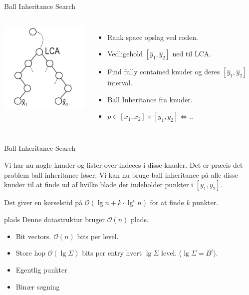 \documentclass[pdf]{beamer}
\begin{document}
\begin{frame}{Ball Inheritance Search}
  \begin{center}
    \begin{columns}
        \includegraphics[scale=1.5]{pictures/BIS.pdf}
        \begin{itemize}
          \item Rank space opslag ved roden.
          \item Vedligehold $[\hat{y}_1, \hat{y}_2]$ ned til LCA.
          \item Find fully contained knuder og deres $[\hat{y}_1, \hat{y}_2]$ interval.
          \item Ball Inheritance fra knuder.
          \item $p \in [x_1, x_2] \times [y_1, y_2] \Leftrightarrow ..$
        \end{itemize}
      \end{columns}
  \end{center}
\end{frame}

\begin{frame}{Ball Inheritance Search}

  Vi har nu nogle knuder og lister over indeces i disse knuder. Det er præcis det problem ball inheritance løser. Vi kan nu bruge ball inheritance på alle disse knuder til at finde ud af hvilke blade der indeholder punkter i $[y_1, y_2]$.

  Det giver en kørselstid på $\mathcal{O}(\lg n + k\cdot\lg^\epsilon n)$ for at finde $k$ punkter.

\end{frame}

\begin{frame}{plads}
  Denne datastruktur bruger $\mathcal{O}(n)$ plads.
  \begin{itemize}
    \item Bit vectors. $\mathcal{O}(n)$ bits per level.
      \pause
    \item Store hop $\mathcal{O}(\lg \Sigma)$ bits per entry hvert $\lg \Sigma$ level. ($\lg \Sigma = B^i$).
      \pause
    \item Egentlig punkter
      \pause
    \item Binær søgning
  \end{itemize}
\end{frame}
\end{document}
